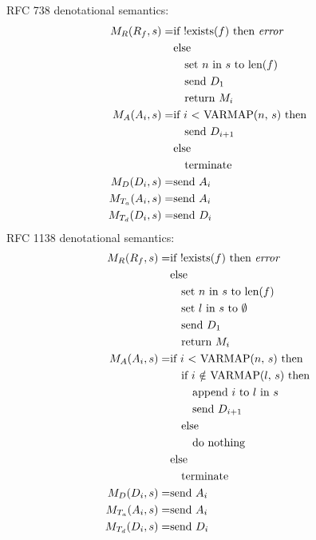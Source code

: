 \documentclass[a0,landscape]{a0poster}
\begin{document}
\begin{multicols}{4}
\begin{multicols}{2}
{\small
RFC 738 denotational semantics:
\begin{align*}
M_{R}(R_{f}, s) = &\text{if !exists($f$) then \em{error}} \\
                          &\text{else} \\
                          &\quad \text{set $n$ in $s$ to len($f$)} \\
                          &\quad \text{send $D_{1}$} \\
                          &\quad \text{return $M_{i}$} \\
M_{A}(A_{i}, s) = &\text{if $i$ $<$ VARMAP($n$, $s$) then} \\
                  &\quad \text{send $D_{i+1}$} \\
                  &\text{else} \\
                  &\quad \text{terminate} \\
M_{D}(D_{i}, s) = &\text{send $A_{i}$} \\
M_{T_{a}}(A_{i}, s) = &\text{send $A_{i}$} \\
M_{T_{d}}(D_{i}, s) = &\text{send $D_{i}$} \\
\end{align*}\break
RFC 1138 denotational semantics:
\begin{align*}
M_{R}(R_{f}, s) = &\text{if !exists($f$) then \em{error}} \\
                          &\text{else} \\
                          &\quad \text{set $n$ in $s$ to len($f$)} \\
                          &\quad \text{set $l$ in $s$ to $\emptyset$} \\
                          &\quad \text{send $D_{1}$} \\
                          &\quad \text{return $M_{i}$} \\
M_{A}(A_{i}, s) = &\text{if $i$ $<$ VARMAP($n$, $s$) then} \\
                  &\quad \text{if $i$ $\notin$ VARMAP($l$, $s$) then} \\
                  &\quad \quad \text{append $i$ to $l$ in $s$} \\
                  &\quad \quad \text{send $D_{i+1}$} \\
                  &\quad \text{else} \\
                  &\quad \quad \text{do nothing} \\
                  &\text{else} \\
                  &\quad \text{terminate} \\
M_{D}(D_{i}, s) = &\text{send $A_{i}$} \\
M_{T_{a}}(A_{i}, s) = &\text{send $A_{i}$} \\
M_{T_{d}}(D_{i}, s) = &\text{send $D_{i}$} \\
\end{align*}}
\end{multicols}


\end{multicols}
\end{document}
